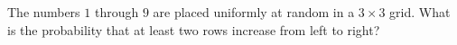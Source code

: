 The numbers $1$ through $9$ are placed uniformly at random in a $3\times3$ grid. What is the probability that at least two rows increase from left to right?
